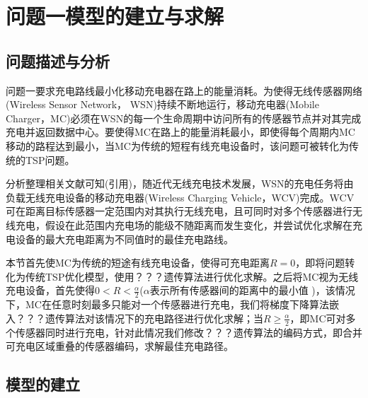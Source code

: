 \documentclass{whutmod}
\newcommand{\upcite}[1]{\textsuperscript{\cite{#1}}}
\begin{document}
	\section{问题一模型的建立与求解}
		\subsection{问题描述与分析}
			问题一要求充电路线最小化移动充电器在路上的能量消耗。为使得无线传感器网络
		(Wireless Sensor Network，	WSN)持续不断地运行，移动充电器(Mobile Charger，MC)必须在WSN的每一个生命周期中访问所有的传感器节点并对其完成充电并返回数据中心。要使得MC在路上的能量消耗最小，即使得每个周期内MC移动的路程达到最小，当MC为传统的短程有线充电设备时，该问题可被转化为传统的TSP问题。
		    
		    分析整理相关文献可知(引用)，随近代无线充电技术发展，WSN的充电任务将由负载无线充电设备的移动充电器(Wireless Charging Vehicle，WCV)完成。WCV可在距离目标传感器一定范围内对其执行无线充电，且可同时对多个传感器进行无线充电，假设在此范围内充电场的能级不随距离而发生变化，并尝试优化求解在充电设备的最大充电距离为不同值时的最佳充电路线。
		    
		    本节首先使MC为传统的短途有线充电设备，使得可充电距离$R=0$，即将问题转化为传统TSP优化模型，使用？？？遗传算法进行优化求解。之后将MC视为无线充电设备，首先使得$0<R<\frac{\alpha }{2}$($\alpha$表示所有传感器间的距离中的最小值 )，该情况下，MC在任意时刻最多只能对一个传感器进行充电，我们将梯度下降算法嵌入？？？遗传算法对该情况下的充电路径进行优化求解；当$R\geqslant \frac{\alpha }{2}$，即MC可对多个传感器同时进行充电，针对此情况我们修改？？？遗传算法的编码方式，即合并可充电区域重叠的传感器编码，求解最佳充电路径。
			
			
		
		
		
		\subsection{模型的建立}
\end{document}
